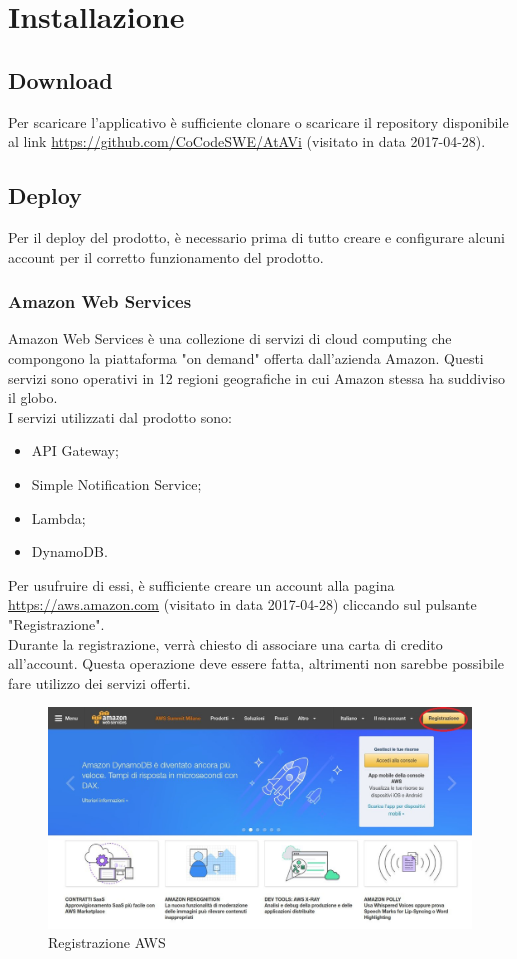 \section{Installazione}
\subsection{Download}
Per scaricare l'applicativo è sufficiente clonare o scaricare il repository disponibile al link \url{https://github.com/CoCodeSWE/AtAVi} (visitato in data 2017-04-28).
\subsection{Deploy}\label{deploy}
Per il deploy del prodotto, è necessario prima di tutto creare e configurare alcuni account per il corretto funzionamento del prodotto.
\subsubsection{Amazon Web Services}
Amazon Web Services è una collezione di servizi di cloud computing che compongono la piattaforma "on demand" offerta dall'azienda Amazon. Questi servizi sono operativi in 12 regioni geografiche in cui Amazon stessa ha suddiviso il globo.\\
I servizi utilizzati dal prodotto sono:
\begin{itemize}
	\item API Gateway;
	\item Simple Notification Service;
	\item Lambda;
	\item DynamoDB.
\end{itemize}
Per usufruire di essi, è sufficiente creare un account alla pagina \url{https://aws.amazon.com} (visitato in data 2017-04-28) cliccando sul pulsante "Registrazione". \\
Durante la registrazione, verrà chiesto di associare una carta di credito all'account. Questa operazione deve essere fatta, altrimenti non sarebbe possibile fare utilizzo dei servizi offerti.
\begin{figure}[h]
\includegraphics[width=\textwidth,height=\textheight,keepaspectratio]{sezioni/images/aws.jpg}
\caption{Registrazione AWS}
\end{figure}

